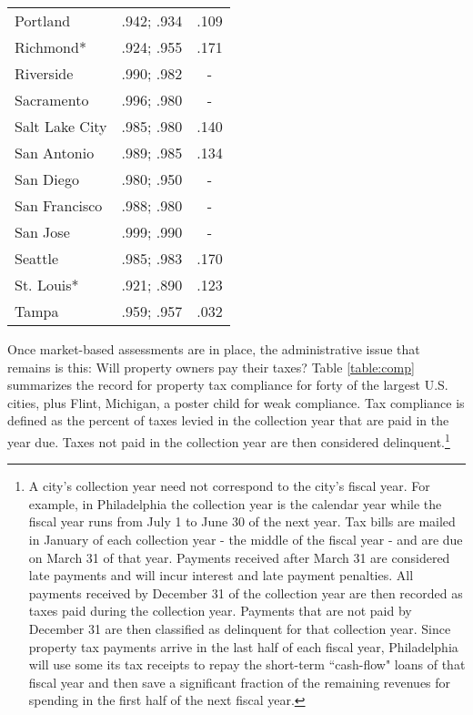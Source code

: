 \documentclass[12pt,titlepage]{article}
\begin{document}
\begin{center}
\begin{longtable}{| l | c |  c|}
Portland	 & .942;  .934	 & .109 \\
Richmond*	 & .924;  .955	 & .171 \\
Riverside	 & .990;  .982	 & - \\
Sacramento	 & .996;  .980	 & - \\
Salt Lake City	 & .985;  .980	 & .140 \\
San Antonio	 & .989;  .985	 & .134 \\
San Diego	 & .980;  .950	 & - \\
San Francisco	 & .988;  .980	 & - \\
San Jose	 & .999;  .990	 & - \\
Seattle	         & .985;  .983	 & .170 \\
St.  Louis*	 & .921;  .890	 & .123 \\
Tampa	         & .959;  .957	 & .032 \\
\end{longtable}
\end{center}

Once market-based assessments are in place, the administrative issue
that remains is this: Will property owners pay their taxes?  Table
\ref{table:comp} summarizes the record for property tax compliance for
forty of the largest U.S. cities, plus Flint, Michigan, a poster child
for weak compliance.  Tax compliance is defined as the percent of
taxes levied in the collection year that are paid in the year due.
Taxes not paid in the collection year are then considered
delinquent.\footnote{A city's collection year need not correspond to
  the city's fiscal year.  For example, in Philadelphia the collection
  year is the calendar year while the fiscal year runs from July 1 to
  June 30 of the next year.  Tax bills are mailed in January of each
  collection year - the middle of the fiscal year - and are due on
  March 31 of that year.  Payments received after March 31 are
  considered late payments and will incur interest and late payment
  penalties.  All payments received by December 31 of the collection
  year are then recorded as taxes paid during the collection year.
  Payments that are not paid by December 31 are then classified as
  delinquent for that collection year.  Since property tax payments
  arrive in the last half of each fiscal year, Philadelphia will use
  some its tax receipts to repay the short-term ``cash-flow" loans of
  that fiscal year and then save a significant fraction of the
  remaining revenues for spending in the first half of the next fiscal
  year.}
\end{document}
